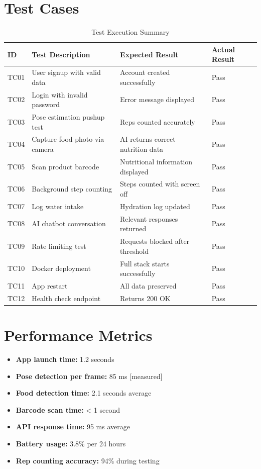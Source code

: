 \documentclass[12pt]{report}
\begin{document}
\section{Test Cases}
\begin{table}[H]
\centering
\renewcommand{\arraystretch}{1.3}
\begin{tabular}{|p{0.9cm}|p{5.5cm}|p{2.8cm}|p{2.5cm}|}
\hline
\textbf{ID} & \textbf{Test Description} & \textbf{Expected Result} & \textbf{Actual Result} \\ \hline
TC01 & User signup with valid data & Account created successfully & Pass \\ \hline
TC02 & Login with invalid password & Error message displayed & Pass \\ \hline
TC03 & Pose estimation pushup test & Reps counted accurately & Pass \\ \hline
TC04 & Capture food photo via camera & AI returns correct nutrition data & Pass \\ \hline
TC05 & Scan product barcode & Nutritional information displayed & Pass \\ \hline
TC06 & Background step counting & Steps counted with screen off & Pass \\ \hline
TC07 & Log water intake & Hydration log updated & Pass \\ \hline
TC08 & AI chatbot conversation & Relevant responses returned & Pass \\ \hline
TC09 & Rate limiting test & Requests blocked after threshold & Pass \\ \hline
TC10 & Docker deployment & Full stack starts successfully & Pass \\ \hline
TC11 & App restart & All data preserved & Pass \\ \hline
TC12 & Health check endpoint & Returns 200 OK & Pass \\ \hline
\end{tabular}
\caption{Test Execution Summary}
\end{table}

\section{Performance Metrics}
\begin{itemize}
    \item \textbf{App launch time:} 1.2 seconds
    \item \textbf{Pose detection per frame:} 85 ms [measured]
    \item \textbf{Food detection time:} 2.1 seconds average
    \item \textbf{Barcode scan time:} < 1 second
    \item \textbf{API response time:} 95 ms average
    \item \textbf{Battery usage:} 3.8\% per 24 hours
    \item \textbf{Rep counting accuracy:} 94\% during testing
\end{itemize}
\end{document}
